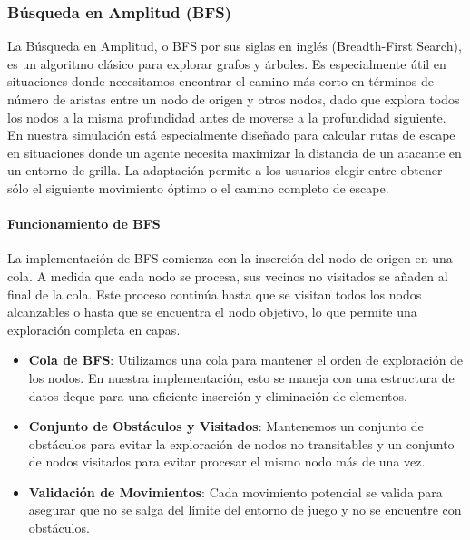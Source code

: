 \documentclass[11pt]{article}
\begin{document}
\subsubsection{Búsqueda en Amplitud (BFS)}
La Búsqueda en Amplitud, o BFS por sus siglas en inglés (Breadth-First Search), es un algoritmo clásico para explorar grafos y árboles. Es especialmente útil en situaciones donde necesitamos encontrar el camino más corto en términos de número de aristas entre un nodo de origen y otros nodos, dado que explora todos los nodos a la misma profundidad antes de moverse a la profundidad siguiente.
En nuestra simulación está especialmente diseñado para calcular rutas de escape en situaciones donde un agente necesita maximizar la distancia de un atacante en un entorno de grilla. La adaptación permite a los usuarios elegir entre obtener sólo el siguiente movimiento óptimo o el camino completo de escape.

\paragraph{Funcionamiento de BFS}
La implementación de BFS comienza con la inserción del nodo de origen en una cola. A medida que cada nodo se procesa, sus vecinos no visitados se añaden al final de la cola. Este proceso continúa hasta que se visitan todos los nodos alcanzables o hasta que se encuentra el nodo objetivo, lo que permite una exploración completa en capas.

\begin{itemize}
    \item \textbf{Cola de BFS}: Utilizamos una cola para mantener el orden de exploración de los nodos. En nuestra implementación, esto se maneja con una estructura de datos deque para una eficiente inserción y eliminación de elementos.
    \item \textbf{Conjunto de Obstáculos y Visitados}: Mantenemos un conjunto de obstáculos para evitar la exploración de nodos no transitables y un conjunto de nodos visitados para evitar procesar el mismo nodo más de una vez.
    \item \textbf{Validación de Movimientos}: Cada movimiento potencial se valida para asegurar que no se salga del límite del entorno de juego y no se encuentre con obstáculos.
\end{itemize}
\end{document}
